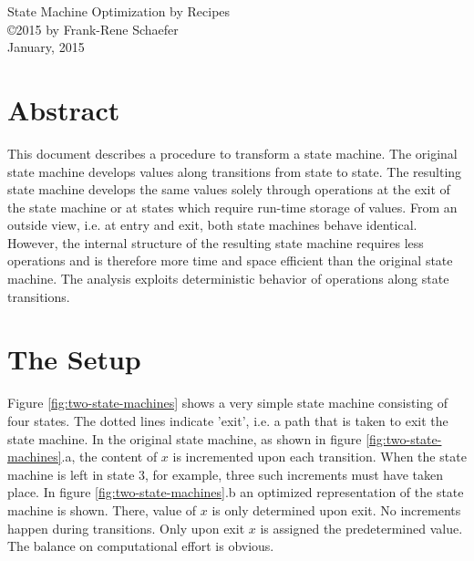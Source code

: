 \documentclass[12pt,a4paper]{scrartcl}
\begin{document}
\begin{center}
{\large State Machine Optimization by Recipes} \\ 
\copyright 2015 by Frank-Rene Schaefer         \\
January, 2015
\end{center}


%
\section{Abstract}

This document describes a procedure to transform a state machine. The original
state machine develops values along transitions from state to state. The
resulting state machine develops the same values solely through operations at
the exit of the state machine or at states which require run-time storage of
values. From an outside view, i.e. at entry and exit, both state machines
behave identical. However, the internal structure of the resulting state
machine requires less operations and is therefore more time and space efficient
than the original state machine.  The analysis exploits deterministic behavior
of operations along state transitions. 


%
\section{The Setup}

Figure \ref{fig:two-state-machines} shows a very simple state machine
consisting of four states.  The dotted lines indicate 'exit', i.e. a path that
is taken to exit the state machine.  In the original state machine, as shown in
figure \ref{fig:two-state-machines}.a, the content of $x$ is incremented upon
each transition. When the state machine is left in state 3, for example, three
such increments must have taken place. In figure \ref{fig:two-state-machines}.b
an optimized representation of the state machine is shown.  There, value of $x$
is only determined upon exit.  No increments happen during transitions. Only
upon exit $x$ is assigned the predetermined value. The balance on computational
effort is obvious.
\end{document}
